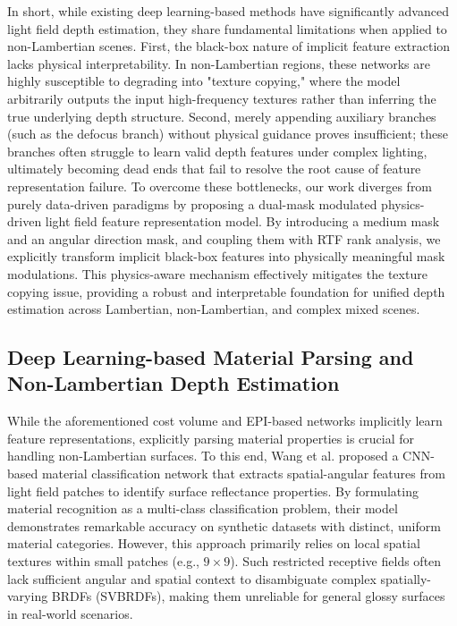 \documentclass[lettersize,journal]{IEEEtran}
\begin{document}
In short, while existing deep learning-based methods have significantly advanced light field depth estimation, they share fundamental limitations when applied to non-Lambertian scenes. First, the black-box nature of implicit feature extraction lacks physical interpretability. In non-Lambertian regions, these networks are highly susceptible to degrading into "texture copying," where the model arbitrarily outputs the input high-frequency textures rather than inferring the true underlying depth structure. Second, merely appending auxiliary branches (such as the defocus branch) without physical guidance proves insufficient; these branches often struggle to learn valid depth features under complex lighting, ultimately becoming dead ends that fail to resolve the root cause of feature representation failure. To overcome these bottlenecks, our work diverges from purely data-driven paradigms by proposing a dual-mask modulated physics-driven light field feature representation model. By introducing a medium mask and an angular direction mask, and coupling them with RTF rank analysis, we explicitly transform implicit black-box features into physically meaningful mask modulations. This physics-aware mechanism effectively mitigates the texture copying issue, providing a robust and interpretable foundation for unified depth estimation across Lambertian, non-Lambertian, and complex mixed scenes.

\subsection{Deep Learning-based Material Parsing and Non-Lambertian Depth Estimation}

While the aforementioned cost volume and EPI-based networks implicitly learn feature representations, explicitly parsing material properties is crucial for handling non-Lambertian surfaces. To this end, Wang et al. \cite{wangwang} proposed a CNN-based material classification network that extracts spatial-angular features from light field patches to identify surface reflectance properties. By formulating material recognition as a multi-class classification problem, their model demonstrates remarkable accuracy on synthetic datasets with distinct, uniform material categories. However, this approach primarily relies on local spatial textures within small patches (e.g., $9 \times 9$). Such restricted receptive fields often lack sufficient angular and spatial context to disambiguate complex spatially-varying BRDFs (SVBRDFs), making them unreliable for general glossy surfaces in real-world scenarios.
\end{document}
